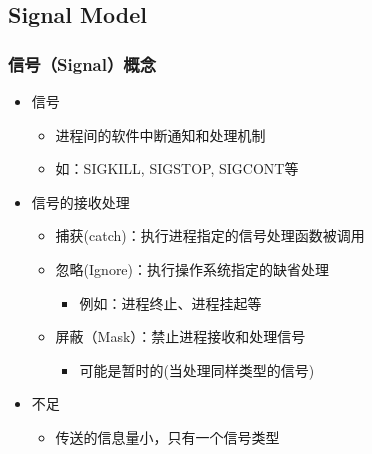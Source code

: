 \subsection{Signal Model} %
\begin{frame}[fragile]
    \frametitle{信号（Signal）概念}

    \begin{itemize}
        \item 信号
        \begin{itemize}
            \item 进程间的软件中断通知和处理机制
            \item 如：SIGKILL, SIGSTOP, SIGCONT等
        \end{itemize} \pause

        \item 信号的接收处理
        \begin{itemize}
            \item 捕获(catch)：执行进程指定的信号处理函数被调用
            \item 忽略(Ignore)：执行操作系统指定的缺省处理
            \begin{itemize}
                \item 例如：进程终止、进程挂起等
            \end{itemize}
            \item 屏蔽（Mask）：禁止进程接收和处理信号
            \begin{itemize}
                \item 可能是暂时的(当处理同样类型的信号)
            \end{itemize}
        \end{itemize} \pause

        \item 不足
        \begin{itemize}
            \item 传送的信息量小，只有一个信号类型
        \end{itemize}
    \end{itemize}

\end{frame}
